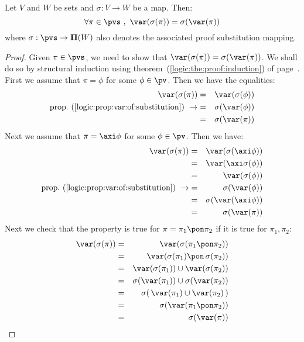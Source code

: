 \begin{prop}\label{logic:prop:FUAP:variable:substitution}
Let $V$ and $W$ be sets and $\sigma:V\to W$ be a map. Then:
    \[
    \forall\pi\in\pvs\ ,\ \var(\sigma(\pi))=\sigma(\var(\pi))
    \]
where $\sigma:\pvs\to{\bf\Pi}(W)$ also denotes the associated proof
substitution mapping.
\end{prop}
\begin{proof}
Given $\pi\in\pvs$, we need to show that
$\var(\sigma(\pi))=\sigma(\var(\pi))$. We shall do so by structural
induction using theorem~(\ref{logic:the:proof:induction}) of
page~\pageref{logic:the:proof:induction}. First we assume that
$\pi=\phi$ for some $\phi\in\pv$. Then we have the equalities:
    \begin{eqnarray*}
    \var(\sigma(\pi))&=&\var(\sigma(\phi))\\
    \mbox{prop.~(\ref{logic:prop:var:of:substitution})}\ \rightarrow
    &=&\sigma(\var(\phi))\\
    &=&\sigma(\var(\pi))\\
    \end{eqnarray*}
Next we assume that $\pi=\axi\phi$ for some $\phi\in\pv$. Then we
have:
    \begin{eqnarray*}
    \var(\sigma(\pi))&=&\var(\sigma(\axi\phi))\\
    &=&\var(\axi\sigma(\phi))\\
    &=&\var(\sigma(\phi))\\
    \mbox{prop.~(\ref{logic:prop:var:of:substitution})}\ \rightarrow
    &=&\sigma(\var(\phi))\\
    &=&\sigma(\var(\axi\phi))\\
    &=&\sigma(\var(\pi))\\
    \end{eqnarray*}
Next we check that the property is true for $\pi=\pi_{1}\pon\pi_{2}$
if it is true for $\pi_{1},\pi_{2}$:
    \begin{eqnarray*}
    \var(\sigma(\pi))&=&\var(\sigma(\pi_{1}\pon\pi_{2}))\\
    &=&\var(\sigma(\pi_{1})\pon\,\sigma(\pi_{2}))\\
    &=&\var(\sigma(\pi_{1}))\cup\var(\sigma(\pi_{2}))\\
    &=&\sigma(\var(\pi_{1}))\cup\sigma(\var(\pi_{2}))\\
    &=&\sigma(\,\var(\pi_{1})\cup\var(\pi_{2})\,)\\
    &=&\sigma(\var(\pi_{1}\pon\pi_{2}))\\
    &=&\sigma(\var(\pi))\\

\end{eqnarray*}
\end{proof}
